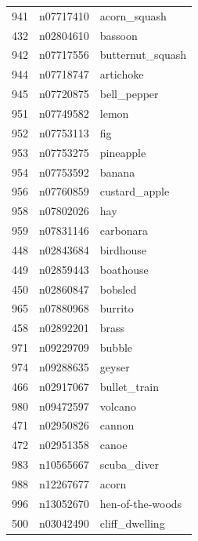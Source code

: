 \begin{table}
\begin{tabular}{cll}
941 & n07717410 & acorn_squash \\
432 & n02804610 & bassoon \\
942 & n07717556 & butternut_squash \\
944 & n07718747 & artichoke \\
945 & n07720875 & bell_pepper \\
951 & n07749582 & lemon \\
952 & n07753113 & fig \\
953 & n07753275 & pineapple \\
954 & n07753592 & banana \\
956 & n07760859 & custard_apple \\
958 & n07802026 & hay \\
959 & n07831146 & carbonara \\
448 & n02843684 & birdhouse \\
449 & n02859443 & boathouse \\
450 & n02860847 & bobsled \\
965 & n07880968 & burrito \\
458 & n02892201 & brass \\
971 & n09229709 & bubble \\
974 & n09288635 & geyser \\
466 & n02917067 & bullet_train \\
980 & n09472597 & volcano \\
471 & n02950826 & cannon \\
472 & n02951358 & canoe \\
983 & n10565667 & scuba_diver \\
988 & n12267677 & acorn \\
996 & n13052670 & hen-of-the-woods \\
500 & n03042490 & cliff_dwelling \\
\bottomrule
\end{tabular}
\end{table}
